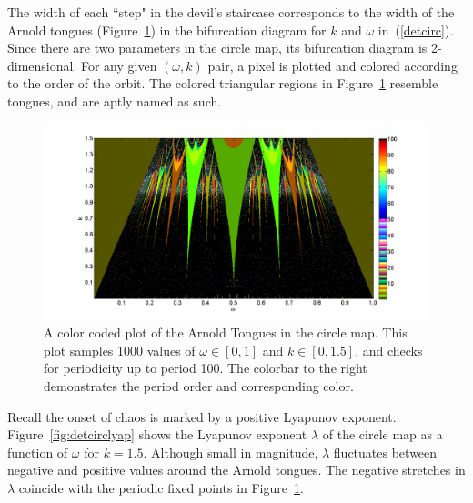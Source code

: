 The width of each ``step" in the devil's staircase corresponds to the width of the Arnold
tongues (Figure~\ref{fig:dettongues}) in the bifurcation diagram for
$k$ and $\omega$ in~(\ref{detcirc}). Since there are two parameters in
the circle map, its bifurcation diagram is 2-dimensional. For any
given $(\omega,k)$ pair, a pixel is plotted and colored according to the order of the orbit. The colored
triangular regions in Figure~\ref{fig:dettongues} resemble tongues,
and are aptly named as such. 
\begin{figure}[!h]
\caption[The Arnold tongues for the deterministic circle map]{A color coded
  plot of the Arnold Tongues in the circle map. This plot samples 1000 values of $\omega
  \in [0,1]$ and $k \in
  [0,1.5]$, and checks for periodicity up to period 100. The colorbar
  to the right demonstrates the period order and corresponding
  color.}\label{fig:dettongues}
	\begin{center}
		\includegraphics[scale=0.45]{figs/tongues_1000_det.png}
	\end{center}
\end{figure}
Recall the onset of chaos is marked by a positive Lyapunov
exponent. Figure~\ref{fig:detcirclyap} shows the Lyapunov exponent
$\lambda$ of
the circle map as a function of $\omega$ for $k=1.5$. Although small in
magnitude, $\lambda$ fluctuates between negative and positive
values around the Arnold tongues. The negative stretches in $\lambda$
coincide with the periodic fixed points in Figure~\ref{fig:dettongues}.  
